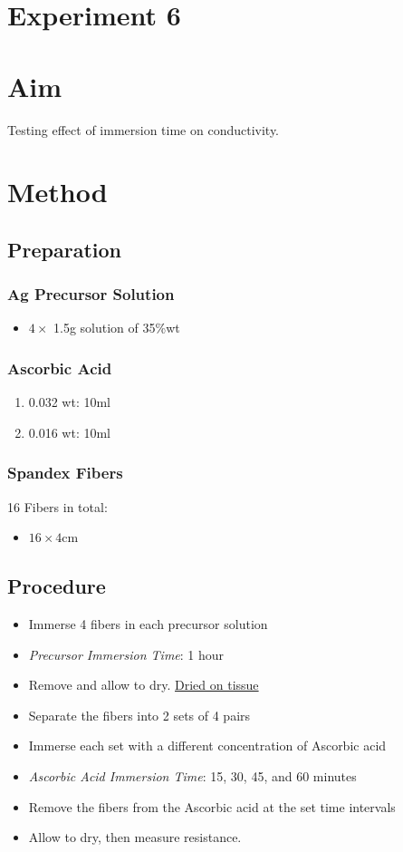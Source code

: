 \documentclass{article}
\begin{document}
\section*{Experiment 6}

\section{Aim}
Testing effect of immersion time on conductivity.

\section{Method}
\subsection{Preparation}
\subsubsection{Ag Precursor Solution}
\begin{itemize}
    \item $4\times$ 1.5g solution of  35\%wt
\end{itemize}

\subsubsection{Ascorbic Acid}
\begin{enumerate}
    \item 0.032 wt: 10ml
    \item 0.016 wt: 10ml
\end{enumerate}

\subsubsection{Spandex Fibers}
16 Fibers in total:
\begin{itemize}
    \item $16\times 4$cm
\end{itemize}

\subsection{Procedure}
\begin{itemize}
    \item Immerse 4 fibers in each precursor solution
    \item \textit{Precursor Immersion Time}: 1 hour
    \item Remove and allow to dry. \underline{Dried on tissue}
    \item Separate the fibers into 2 sets of 4 pairs
    \item Immerse each set with a different concentration of Ascorbic acid
    \item \textit{Ascorbic Acid Immersion Time}: 15, 30, 45, and 60 minutes
    \item Remove the fibers from the Ascorbic acid at the set time intervals 
    \item Allow to dry, then measure resistance.
\end{itemize}
\end{document}
